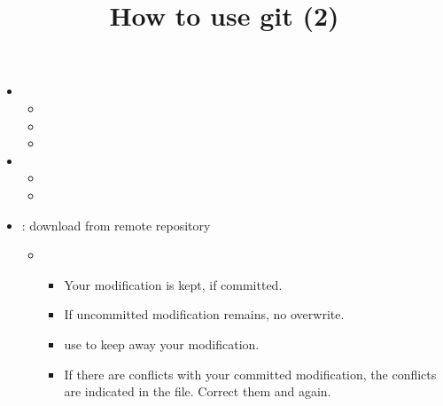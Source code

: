 \documentclass[12pt]{article}
\begin{document}
\title{How to use git (2)}
\begin{itemize}
\item
{}
\begin{itemize}
\item
{}
\item
{}
\item
{}
\end{itemize}
\item
{}
\begin{itemize}
\item
{}
\item
{}
\end{itemize}
\item
{}: download from remote repository
\begin{itemize}
\item
{}
\begin{itemize}
\item
Your modification is kept, if committed.
\item
If uncommitted modification remains, no overwrite.
\item
use  to keep away your modification.
\item
If there are conflicts with your committed modification, the conflicts
are indicated in the file. Correct them and  again.
\end{itemize}
\end{itemize}
\end{itemize}
\end{document}

